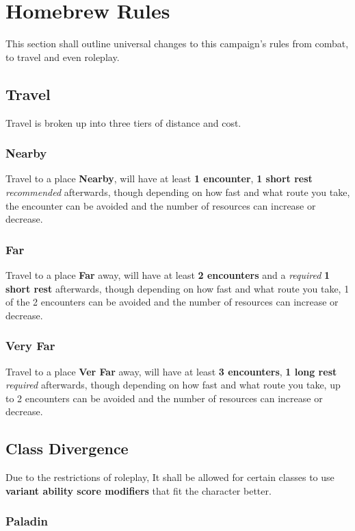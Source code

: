 \section{Homebrew Rules}
This section shall outline universal changes to this campaign's rules from combat, to travel and even roleplay.

\subsection{Travel}
Travel is broken up into three tiers of distance and cost.

\subsubsection{Nearby}
Travel to a place \textbf{Nearby}, will have at least \textbf{1 encounter}, \textbf{1 short rest} \textit{recommended} afterwards, though depending on how fast and what route you take, the encounter can be avoided and the number of resources can increase or decrease. 

\subsubsection{Far}
Travel to a place \textbf{Far} away, will have at least \textbf{2 encounters} and a \textit{required} \textbf{1 short rest} afterwards, though depending on how fast and what route you take, 1 of the 2 encounters can be avoided and the number of resources can increase or decrease.

\subsubsection{Very Far}
Travel to a place \textbf{Ver Far} away, will have at least \textbf{3 encounters}, \textbf{1 long rest} \textit{required} afterwards, though depending on how fast and what route you take, up to 2 encounters can be avoided and the number of resources can increase or decrease.

\subsection{Class Divergence}
Due to the restrictions of roleplay, It shall be allowed for certain classes to use \textbf{variant ability score modifiers} that fit the character better.

\subsubsection{Paladin}

